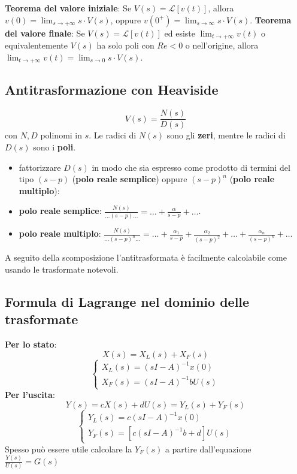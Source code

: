 \begin{landscape}
\begin{multicols*}{3}
    \newline
    \textbf{Teorema del valore iniziale}:\newline
    Se $V(s) = \mathcal{L}[v(t)]$, allora $v(0) = \lim_{s\rightarrow +\infty} s \cdot V(s)$, oppure $v(0^+) = \lim_{s\rightarrow \infty}s \cdot V(s)$.\newline
    \newline
    \textbf{Teorema del valore finale}:\newline
    Se $V(s) = \mathcal{L}[v(t)]$ ed esiste $\lim_{t\rightarrow +\infty} v(t)$ o equivalentemente $V(s)$ ha solo poli con $Re< 0$ o nell'origine, allora $\lim_{t\rightarrow +\infty} v(t) = \lim_{s\rightarrow 0} s \cdot V(s)$.
    \subsection{Antitrasformazione con Heaviside}
    \[
        V(s) = \frac{N(s)}{D(s)}
    \]
    con $N,D$ polinomi in $s$.\newline
    Le radici di $N(s)$ sono gli \textbf{zeri}, mentre le radici di $D(s)$ sono i \textbf{poli}.\newline
    \begin{itemize}
        \item fattorizzare $D(s)$ in modo che sia espresso come prodotto di termini del tipo $(s-p)$ (\textbf{polo reale semplice}) oppure $(s-p)^n$ (\textbf{polo reale multiplo}):
        \item \textbf{polo reale semplice}: $\frac{N(s)}{\dots(s-p)\dots} = \dots + \frac{\alpha}{s-p} + \dots$.
        \item \textbf{polo reale multiplo}: $\frac{N(s)}{\dots (s-p)^n \dots} = \dots + \frac{\alpha_1}{s-p} + \frac{\alpha_2}{(s-p)^2} + \dots + \frac{\alpha_n}{(s-p)^n} + \dots$
    \end{itemize}
    A seguito della scomposizione l'antitrasformata è facilmente calcolabile come usando le trasformate notevoli.
    \subsection{Formula di Lagrange nel dominio delle trasformate}
    \textbf{Per lo stato}:
    \[
        X(s) = X_L(s) + X_F(s)
    \]
    \[
        \begin{cases}
            X_L(s) = (sI-A)^{-1} x(0)\\
            X_F(s) = (sI-A) ^{-1} b U(s)
        \end{cases}
    \]
    \textbf{Per l'uscita}:
    \[
        Y(s) = cX(s) + dU(s) = Y_L(s) + Y_F(s)
    \]
    \[
        \begin{cases}
            Y_L(s) = c(sI-A)^{-1} x(0)\\
            Y_F(s) = [c(sI-A)^{-1} b + d]U(s)
        \end{cases}
    \]
    Spesso può essere utile calcolare la $Y_F(s)$ a partire dall'equazione $\frac{Y(s)}{U(s)} = G(s)$

\end{multicols*}
\end{landscape}
